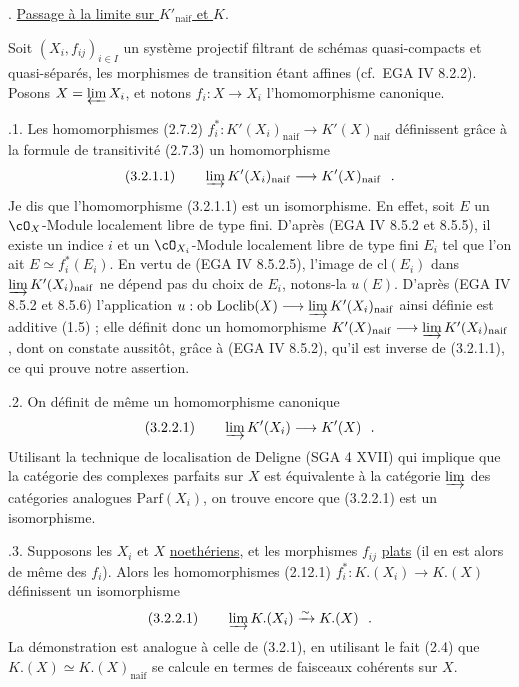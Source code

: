 \medskip

. \underline{Passage \`{a} la limite sur $K'_{\mathrm{naif}}$ et $K.$}

Soit $(X_i, f_{ij})_{i \in I}$ un syst\`{e}me projectif filtrant de sch\'{e}mas quasi-compacts et quasi-s\'{e}par\'{e}s, les morphismes de transition \'{e}tant affines (cf.\ EGA IV 8.2.2). Posons $X = \varprojlim X_i$, et notons $f_i : X \longrightarrow X_i$ l'homomorphisme canonique.

\medskip

.1. Les homomorphismes (2.7.2) $f_i^* : K'(X_i)_{\mathrm{naif}} \longrightarrow K'(X)_{\mathrm{naif}}$ d\'{e}finissent gr\^{a}ce \`{a} la formule de transitivit\'{e} (2.7.3) un homomorphisme
\[
\mathrm{(3.2.1.1)} \qquad \varinjlim K'(X_i)_{\mathrm{naif}} \longrightarrow K'(X)_{\mathrm{naif}}\ \ .
\]
Je dis que l'homomorphisme (3.2.1.1) est un isomorphisme. En effet, soit $E$ un $\cO_X$-Module localement libre de type fini. D'apr\`{e}s (EGA IV 8.5.2 et 8.5.5), il existe un indice $i$ et un $\cO_{X_i}$-Module localement libre de type fini $E_i$ tel que l'on ait $E \simeq f_i^*(E_i)$. En vertu de (EGA IV 8.5.2.5), l'image de $\mathrm{cl}(E_i)$ dans $\varinjlim K'(X_i)_{\mathrm{naif}}$ ne d\'{e}pend pas du choix de $E_i$, notons-la $u(E)$. D'apr\`{e}s (EGA IV 8.5.2 et 8.5.6) l'application $u : \mathrm{ob}\ \mathrm{Loclib}(X) \longrightarrow \varinjlim K'(X_i)_{\mathrm{naif}}$ ainsi d\'{e}finie est additive (1.5) ; elle d\'{e}finit donc un homomorphisme $K'(X)_{\mathrm{naif}} \longrightarrow \varinjlim K'(X_i)_{\mathrm{naif}}$, dont on constate aussit\^{o}t, gr\^{a}ce \`{a} (EGA IV 8.5.2), qu'il est inverse de (3.2.1.1), ce qui prouve notre assertion.

\medskip

.2. On d\'{e}finit de m\^{e}me un homomorphisme canonique
\[
\mathrm{(3.2.2.1)} \qquad \varinjlim K'(X_i) \longrightarrow K'(X)\ \ .
\]
Utilisant la technique de localisation de Deligne (SGA 4 XVII) qui implique que la cat\'{e}gorie des complexes parfaits sur $X$ est \'{e}quivalente \`{a} la cat\'{e}gorie $\varinjlim$ des cat\'{e}gories analogues $\mathrm{Parf}(X_i)$, on trouve encore que (3.2.2.1) est un isomorphisme.

\medskip

.3. Supposons les $X_i$ et $X$ \underline{noeth\'{e}riens}, et les morphismes $f_{ij}$ \underline{plats} (il en est alors de m\^{e}me des $f_i$). Alors les homomorphismes (2.12.1) $f_i^* : K.(X_i) \longrightarrow K.(X)$ d\'{e}finissent un isomorphisme
\[
\mathrm{(3.2.2.1)} \qquad \varinjlim K.(X_i) \xrightarrow{\sim} K.(X)\ \ .
\]
La d\'{e}monstration est analogue \`{a} celle de (3.2.1), en utilisant le fait (2.4) que $K.(X) \simeq K.(X)_{\mathrm{naif}}$ se calcule en termes de faisceaux coh\'{e}rents sur $X$.

